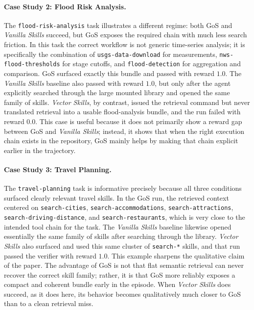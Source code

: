 \paragraph{Case Study 2: Flood Risk Analysis.} The \texttt{flood-risk-analysis} task illustrates a different regime: both GoS and \textit{Vanilla Skills} succeed, but GoS exposes the required chain with much less search friction. In this task the correct workflow is not generic time-series analysis; it is specifically the combination of \texttt{usgs-data-download} for measurements, \texttt{nws-flood-thresholds} for stage cutoffs, and \texttt{flood-detection} for aggregation and comparison. GoS surfaced exactly this bundle and passed with reward $1.0$. The \textit{Vanilla Skills} baseline also passed with reward $1.0$, but only after the agent explicitly searched through the large mounted library and opened the same family of skills. \textit{Vector Skills}, by contrast, issued the retrieval command but never translated retrieval into a usable flood-analysis bundle, and the run failed with reward $0.0$. This case is useful because it does not primarily show a reward gap between GoS and \textit{Vanilla Skills}; instead, it shows that when the right execution chain exists in the repository, GoS mainly helps by making that chain explicit earlier in the trajectory.

\paragraph{Case Study 3: Travel Planning.} The \texttt{travel-planning} task is informative precisely because all three conditions surfaced clearly relevant travel skills. In the GoS run, the retrieved context centered on \texttt{search-cities}, \texttt{search-accommodations}, \texttt{search-attractions}, \texttt{search-driving-distance}, and \texttt{search-restaurants}, which is very close to the intended tool chain for the task. The \textit{Vanilla Skills} baseline likewise opened essentially the same family of skills after searching through the library. \textit{Vector Skills} also surfaced and used this same cluster of \texttt{search-*} skills, and that run passed the verifier with reward $1.0$. This example sharpens the qualitative claim of the paper. The advantage of GoS is not that flat semantic retrieval can never recover the correct skill family; rather, it is that GoS more reliably exposes a compact and coherent bundle early in the episode. When \textit{Vector Skills} does succeed, as it does here, its behavior becomes qualitatively much closer to GoS than to a clean retrieval miss.

